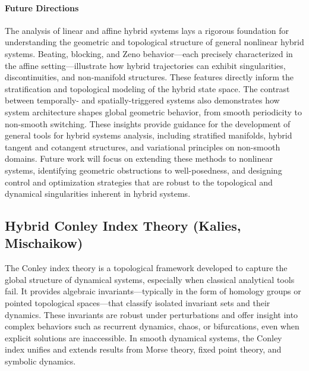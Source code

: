\documentclass[letterpaper,11pt]{article}
\begin{document}
\paragraph{Future Directions}
The analysis of linear and affine hybrid systems lays a rigorous foundation for understanding the geometric and topological structure of general nonlinear hybrid systems.
Beating, blocking, and Zeno behavior—each precisely characterized in the affine setting—illustrate how hybrid trajectories can exhibit singularities, discontinuities, and non-manifold structures.
These features directly inform the stratification and topological modeling of the hybrid state space.
The contrast between temporally- and spatially-triggered systems also demonstrates how system architecture shapes global geometric behavior, from smooth periodicity to non-smooth switching.
These insights provide guidance for the development of general tools for hybrid systems analysis, including stratified manifolds, hybrid tangent and cotangent structures, and variational principles on non-smooth domains.
Future work will focus on extending these methods to nonlinear systems, identifying geometric obstructions to well-posedness, and designing control and optimization strategies that are robust to the topological and dynamical singularities inherent in hybrid systems.


\subsection{Hybrid Conley Index Theory (Kalies, Mischaikow)}\label{sec:hybrid_Conley}

The Conley index theory is a topological framework developed to capture the global structure of dynamical systems, especially when classical analytical tools fail.
It provides algebraic invariants—typically in the form of homology groups or pointed topological spaces—that classify isolated invariant sets and their dynamics.
These invariants are robust under perturbations and offer insight into complex behaviors such as recurrent dynamics, chaos, or bifurcations, even when explicit solutions are inaccessible.
In smooth dynamical systems, the Conley index unifies and extends results from Morse theory, fixed point theory, and symbolic dynamics.
\end{document}
